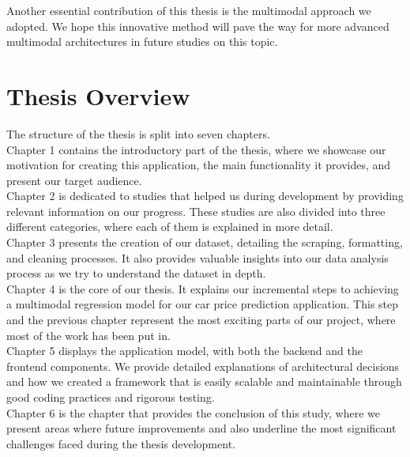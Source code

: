 Another essential contribution of this thesis is the multimodal approach we adopted. We hope this innovative method will pave the way for more advanced multimodal architectures in future studies on this topic.

\section{Thesis Overview}

The structure of the thesis is split into seven chapters.
\\

Chapter 1 contains the introductory part of the thesis, where we showcase our motivation for creating this application, the main functionality it provides, and present our target audience.
\\

Chapter 2 is dedicated to studies that helped us during development by providing relevant information on our progress. These studies are also divided into three different categories, where each of them is explained in more detail.
\\

Chapter 3 presents the creation of our dataset, detailing the scraping, formatting, and cleaning processes. It also provides valuable insights into our data analysis process as we try to understand the dataset in depth.
\\

Chapter 4 is the core of our thesis. It explains our incremental steps to achieving a multimodal regression model for our car price prediction application. This step and the previous chapter represent the most exciting parts of our project, where most of the work has been put in.
\\

Chapter 5 displays the application model, with both the backend and the frontend components. We provide detailed explanations of architectural decisions and how we created a framework that is easily scalable and maintainable through good coding practices and rigorous testing.
\\

Chapter 6 is the chapter that provides the conclusion of this study, where we present areas where future improvements and also underline the most significant challenges faced during the thesis development.
\\
